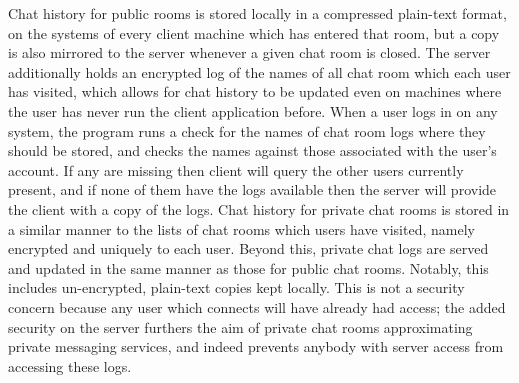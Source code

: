 \documentclass[12pt]{report}
\begin{document}
\begin{flushleft}
\indent Chat history for public rooms is stored locally in a compressed plain-text format, on the systems of every client machine which has entered that room, but a copy is also mirrored to the server whenever a given chat room is closed. The server additionally holds an encrypted log of the names of all chat room which each user has visited, which allows for chat history to be updated even on machines where the user has never run the client application before. When a user logs in on any system, the program runs a check for  the names of chat room logs where they should be stored, and checks the names against those associated with the user's account. If any are missing then client will query the other users currently present, and if none of them have the logs available then the server will provide the client with a copy of the logs. Chat history for private chat rooms is stored in a similar manner to the lists of chat rooms which users have visited, namely encrypted and uniquely to each user. Beyond this, private chat logs are served and updated in the same manner as those for public chat rooms. Notably, this includes un-encrypted, plain-text copies kept locally. This is not a security concern because any user which connects will have already had access; the added security on the server furthers the aim of private chat rooms approximating private messaging services, and indeed prevents anybody with server access from accessing these logs.

\end{flushleft}
\end{document}

